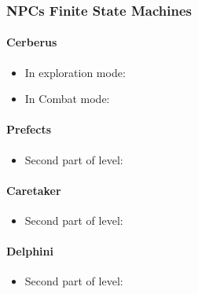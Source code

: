 \subsubsection{NPCs Finite State Machines}

\paragraph{Cerberus}
\begin{itemize}
\item In exploration mode: 
\item In Combat mode:      
\end{itemize}
\pagebreak

\paragraph{Prefects}
\begin{itemize}
\item Second part of level: 
\end{itemize}
\pagebreak

\paragraph{Caretaker}
\begin{itemize}
\item Second part of level: 
\end{itemize}
\pagebreak

\paragraph{Delphini}
\begin{itemize}
\item Second part of level: 
\end{itemize}
\pagebreak